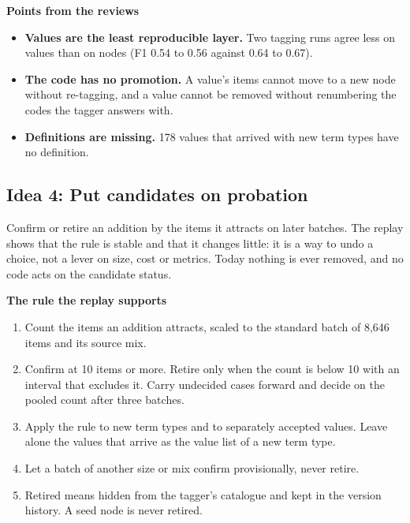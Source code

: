 \documentclass[10pt,a4paper]{article}
\newcommand{\lab}[1]{\par\vspace{0.35em}\textbf{#1}\par\nobreak}
\begin{document}
\lab{Points from the reviews}
\begin{itemize}
\item \textbf{Values are the least reproducible layer.} Two tagging runs agree less on values than on nodes (F1 0.54 to 0.56 against 0.64 to 0.67).
\item \textbf{The code has no promotion.} A value's items cannot move to a new node without re-tagging, and a value cannot be removed without renumbering the codes the tagger answers with.
\item \textbf{Definitions are missing.} 178 values that arrived with new term types have no definition.
\end{itemize}

\subsection{Idea 4: Put candidates on probation}

Confirm or retire an addition by the items it attracts on later batches. The replay shows that the rule is
stable and that it changes little: it is a way to undo a choice, not a lever on size, cost or metrics.
Today nothing is ever removed, and no code acts on the candidate status.

\lab{The rule the replay supports}
\begin{enumerate}
\item Count the items an addition attracts, scaled to the standard batch of 8,646 items and its source mix.
\item Confirm at 10 items or more. Retire only when the count is below 10 with an interval that excludes it. Carry undecided cases forward and decide on the pooled count after three batches.
\item Apply the rule to new term types and to separately accepted values. Leave alone the values that arrive as the value list of a new term type.
\item Let a batch of another size or mix confirm provisionally, never retire.
\item Retired means hidden from the tagger's catalogue and kept in the version history. A seed node is never retired.
\end{enumerate}
\end{document}
